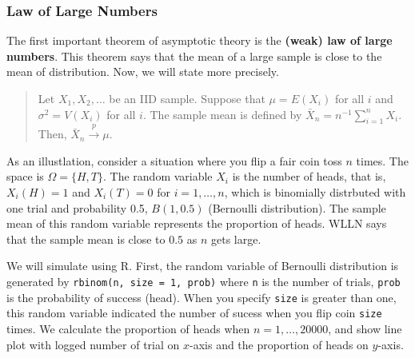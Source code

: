 \documentclass[
  12pt,
]{article}
\begin{document}
\hypertarget{law-of-large-numbers}{%
\subsubsection{Law of Large Numbers}\label{law-of-large-numbers}}

The first important theorem of asymptotic theory is the \textbf{(weak)
law of large numbers}. This theorem says that the mean of a large sample
is close to the mean of distribution. Now, we will state more precisely.

\begin{quote}
Let \(X_1, X_2, \ldots\) be an IID sample. Suppose that \(\mu = E(X_i)\)
for all \(i\) and \(\sigma^2 = V(X_i)\) for all \(i\). The sample mean
is defined by \(\bar{X}_n = n^{-1} \sum_{i=1}^n X_i\). Then,
\(\bar{X}_n \stackrel{p}{\to} \mu\).
\end{quote}

As an illustlation, consider a situation where you flip a fair coin toss
\(n\) times. The space is \(\Omega = \{H, T\}\). The random variable
\(X_i\) is the number of heads, that is, \(X_i(H) = 1\) and
\(X_i(T) = 0\) for \(i = 1, \ldots, n\), which is binomially distrbuted
with one trial and probability 0.5, \(B(1, 0.5)\) (Bernoulli
distribution). The sample mean of this random variable represents the
proportion of heads. WLLN says that the sample mean is close to \(0.5\)
as \(n\) gets large.

We will simulate using R. First, the random variable of Bernoulli
distribution is generated by \texttt{rbinom(n,\ size\ =\ 1,\ prob)}
where \texttt{n} is the number of trials, \texttt{prob} is the
probability of success (head). When you specify \texttt{size} is greater
than one, this random variable indicated the number of sucess when you
flip coin \texttt{size} times. We calculate the proportion of heads when
\(n = 1, \ldots, 20000\), and show line plot with logged number of trial
on \(x\)-axis and the proportion of heads on \(y\)-axis.
\end{document}
